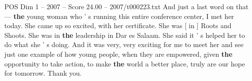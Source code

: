 \begin{textsample}{POS Dim 1 – 2007 – Score 24.00 – 2007/t000223.txt}
And just a last word on that — \textbf{the} young woman who ' s running this entire conference center, I met her today.
She came up so excited, with her certificate.
She was [ in ] Roots and Shoots.
She was in \textbf{the} leadership in Dar es Salaam.
She said it ' s helped her to do what she ' s doing.
And it was very, very exciting for me to meet her and see just one example of how young people, when they are empowered, given \textbf{the} opportunity to take action, to make \textbf{the} world a better place, truly are our hope for tomorrow.
Thank you.

\end{textsample}
